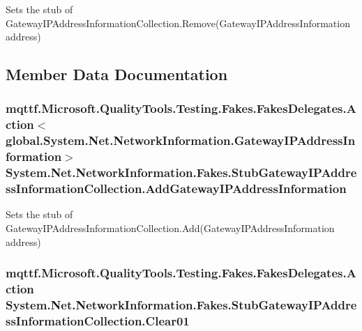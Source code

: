 Sets the stub of Gateway\-I\-P\-Address\-Information\-Collection.\-Remove(\-Gateway\-I\-P\-Address\-Information address)



\subsection{Member Data Documentation}
\hypertarget{class_system_1_1_net_1_1_network_information_1_1_fakes_1_1_stub_gateway_i_p_address_information_collection_a5ce6bab2b820b81649a6f87ffbd3899c}{
\subsubsection[{Add\-Gateway\-I\-P\-Address\-Information}]{\setlength{\rightskip}{0pt plus 5cm}mqttf.\-Microsoft.\-Quality\-Tools.\-Testing.\-Fakes.\-Fakes\-Delegates.\-Action$<$global.\-System.\-Net.\-Network\-Information.\-Gateway\-I\-P\-Address\-Information$>$ System.\-Net.\-Network\-Information.\-Fakes.\-Stub\-Gateway\-I\-P\-Address\-Information\-Collection.\-Add\-Gateway\-I\-P\-Address\-Information}}\label{class_system_1_1_net_1_1_network_information_1_1_fakes_1_1_stub_gateway_i_p_address_information_collection_a5ce6bab2b820b81649a6f87ffbd3899c}


Sets the stub of Gateway\-I\-P\-Address\-Information\-Collection.\-Add(\-Gateway\-I\-P\-Address\-Information address)

\hypertarget{class_system_1_1_net_1_1_network_information_1_1_fakes_1_1_stub_gateway_i_p_address_information_collection_a69ed07f85f5e81770fb51f1c7b93b0ff}{
\subsubsection[{Clear01}]{\setlength{\rightskip}{0pt plus 5cm}mqttf.\-Microsoft.\-Quality\-Tools.\-Testing.\-Fakes.\-Fakes\-Delegates.\-Action System.\-Net.\-Network\-Information.\-Fakes.\-Stub\-Gateway\-I\-P\-Address\-Information\-Collection.\-Clear01}}\label{class_system_1_1_net_1_1_network_information_1_1_fakes_1_1_stub_gateway_i_p_address_information_collection_a69ed07f85f5e81770fb51f1c7b93b0ff}


